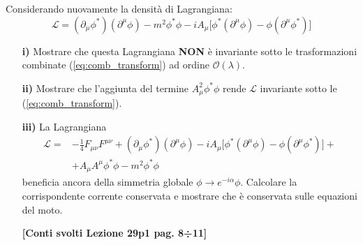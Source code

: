 \documentclass[../main.tex]{subfiles}
\begin{document}
\begin{exercise}
    Considerando nuovamente la densità di Lagrangiana:
    \[
    \mathscr{L} =(\partial_\mu\phi^\ast)(\partial^\mu\phi)-m^2\phi^\ast\phi - iA_\mu\big[ \phi^\ast(\partial^\mu\phi) - \phi(\partial^\mu\phi^\ast) \big]
    \]
    \begin{enumerate}
        \item[\textbf{i)}] Mostrare che questa Lagrangiana \textbf{NON} è invariante sotto le trasformazioni combinate (\ref{eq:comb_transform}) ad ordine $\mathscr O (\lambda)$.
        \item[\textbf{ii)}] Mostrare che l'aggiunta del termine $A_\mu^2\phi^\ast\phi$ rende $\mathscr{L}$ invariante sotto le (\ref{eq:comb_transform}).
        \item[\textbf{iii)}] La Lagrangiana 
        \begin{align*}
            \mathscr{L} =& -\frac{1}{4}F_{\mu\nu}F^{\mu\nu} + (\partial_\mu\phi^\ast)(\partial^\mu\phi) - iA_\mu\big[ \phi^\ast(\partial^\mu\phi) - \phi(\partial^\mu\phi^\ast) \big] +\\
            &+A_\mu A^\mu\phi^\ast\phi-m^2\phi^\ast\phi
        \end{align*}
        beneficia ancora della simmetria globale $\phi\rightarrow e^{-i\alpha}\phi$. Calcolare la corrispondente corrente conservata e mostrare che è conservata sulle equazioni del moto.

        \textbf{[Conti svolti Lezione 29p1 pag. 8÷11]}
    \end{enumerate}
\end{exercise}
\end{document}
